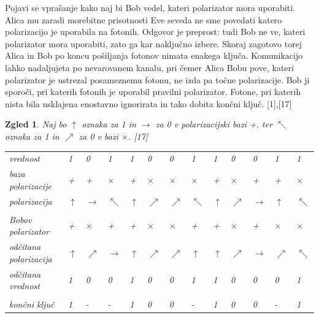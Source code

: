 \documentclass[A4paper, 11pt]{article}
\newtheorem{zgled}{Zgled}
\begin{document}
Pojavi se vprašanje kako naj bi Bob vedel, kateri polarizator mora uporabiti. Alica mu zaradi morebitne prisotnosti Eve seveda ne sme povedati katero polarizacijo je uporabila na fotonih. Odgovor je preprost: tudi Bob ne ve, kateri polarizator mora uporabiti, zato ga kar naključno izbere. Skoraj zagotovo torej Alica in Bob po koncu pošiljanja fotonov nimata enakega ključa. Komunikacijo lahko nadaljujeta po nevarovanem kanalu, pri čemer Alica Bobu pove, kateri polarizator je ustrezal posameznemu fotonu, ne izda pa točne polarizacije. Bob ji sporoči, pri katerih fotonih je uporabil pravilni polarizator. Fotone, pri katerih nista bila usklajena enostavno ignorirata in tako dobita končni ključ. [1],[17] \\

\begin{zgled}
Naj bo $\uparrow$ oznaka za 1 in $\rightarrow$ za 0 v polarizacijski bazi +, ter $\nwarrow$ oznaka za 1 in $\nearrow$ za 0 v bazi $\times$. [17]


\begin{center}
\begin{tabular}{ l m{0.3 cm} m{0.3 cm} m{0.3 cm} m{0.3 cm} m{0.3 cm} m{0.3 cm} m{0.3 cm} m{0.3 cm} m{0.3 cm} m{0.3 cm} m{0.3 cm} m{0.3 cm}}
vrednost & 1 & 0 & 1 & 1 & 0 & 0 & 1 & 1 & 0 & 0 & 1 & 1 \\
baza polarizacije & + & + & $\times$ & + & $\times$ & $\times$ & $\times$ & + & $\times$ & + & + & $\times$\\
polarizacija & $\uparrow$ & $\rightarrow$ & $\nwarrow$ & $\uparrow$ & $\nearrow$ & $\nearrow$ & $\nwarrow$  & $\uparrow$ & $\nearrow$ & $\rightarrow$ & $\uparrow$ & $\nwarrow$\\
\\
Bobov polarizator & + & $\times$ & + & + & $\times$ & $\times$ & + & + & $\times$ & + & $\times$ & $\times$\\
odčitana polarizacija & $\uparrow$ & $\nearrow$ & $\rightarrow$ & $\uparrow$ & $\nearrow$  & $\nearrow$ & $\uparrow$ & $\uparrow$ & $\nearrow$ & $\rightarrow$ & $\nearrow$ & $\nwarrow$\\
odčitana vrednost & 1 & 0 & 0 & 1 & 0 & 0 & 1 & 1 & 0 & 0 & 0 & 1\\
\\
končni ključ & 1 & - & - & 1 & 0 & 0 & - & 1 & 0 & 0 & - & 1\\
\end{tabular}
\end{center}

\end{zgled}
\end{document}
